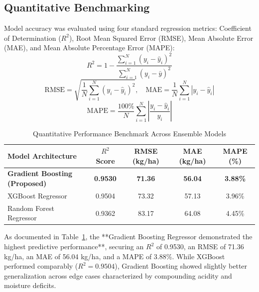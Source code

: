 \documentclass[conference]{IEEEtran}
\begin{document}
\subsection{Quantitative Benchmarking}
Model accuracy was evaluated using four standard regression metrics: Coefficient of Determination ($R^2$), Root Mean Squared Error (RMSE), Mean Absolute Error (MAE), and Mean Absolute Percentage Error (MAPE):
\begin{equation}
R^2 = 1 - \frac{\sum_{i=1}^N (y_i - \hat{y}_i)^2}{\sum_{i=1}^N (y_i - \bar{y})^2}
\end{equation}
\begin{equation}
\text{RMSE} = \sqrt{\frac{1}{N} \sum_{i=1}^N (y_i - \hat{y}_i)^2}, \quad \text{MAE} = \frac{1}{N} \sum_{i=1}^N |y_i - \hat{y}_i|
\end{equation}
\begin{equation}
\text{MAPE} = \frac{100\%}{N} \sum_{i=1}^N \left| \frac{y_i - \hat{y}_i}{y_i} \right|
\end{equation}

\begin{table}[htbp]
\caption{Quantitative Performance Benchmark Across Ensemble Models}
\begin{center}
\begin{tabular}{lcccc}
\toprule
\textbf{Model Architecture} & \textbf{$R^2$ Score} & \textbf{RMSE (kg/ha)} & \textbf{MAE (kg/ha)} & \textbf{MAPE (\%)} \\
\midrule
\textbf{Gradient Boosting (Proposed)} & \textbf{0.9530} & \textbf{71.36} & \textbf{56.04} & \textbf{3.88\%} \\
XGBoost Regressor & 0.9504 & 73.32 & 57.13 & 3.96\% \\
Random Forest Regressor & 0.9362 & 83.17 & 64.08 & 4.45\% \\
\bottomrule
\end{tabular}
\label{tab:benchmark_results}
\end{center}
\end{table}

As documented in Table~\ref{tab:benchmark_results}, the **Gradient Boosting Regressor demonstrated the highest predictive performance**, securing an $R^2$ of 0.9530, an RMSE of 71.36 kg/ha, an MAE of 56.04 kg/ha, and a MAPE of 3.88\%. While XGBoost performed comparably ($R^2 = 0.9504$), Gradient Boosting showed slightly better generalization across edge cases characterized by compounding acidity and moisture deficits.
\end{document}
